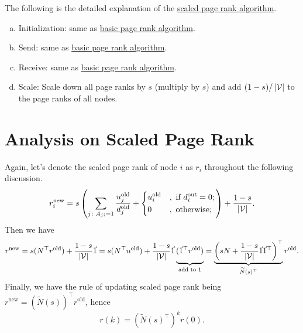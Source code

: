 \begin{remark}
	The following is the detailed explanation of the \hyperref[algo:scaled-page-rank-algorithm]{scaled page rank algorithm}.
	\begin{enumerate}[(a)]
		\item \label{algo:scaled-page-rank-algorithm:initialize} Initialization: same as \hyperref[algo:basic-page-rank-algorithm]{basic page rank algorithm}.
		\item \label{algo:scaled-page-rank-algorithm:send} Send: same as \hyperref[algo:basic-page-rank-algorithm]{basic page rank algorithm}.
		\item \label{algo:scaled-page-rank-algorithm:receive} Receive: same as \hyperref[algo:basic-page-rank-algorithm]{basic page rank algorithm}.
		\item \label{algo:scaled-page-rank-algorithm:scale} Scale: Scale down all page ranks by \(s\) (multiply by \(s\)) and
		      add \((1-s) / \left\vert \mathcal{\MakeUppercase{v}} \right\vert \) to the page ranks of all nodes.
	\end{enumerate}
\end{remark}

\section{Analysis on Scaled Page Rank}
Again, let's denote the scaled page rank of node \(i\) as \(r_i\) throughout the following discussion.
\[
	r_{i}^{\text{new}} = s\left(\sum\limits_{j\colon A_{ji} = 1} \frac{u_{j}^{\text{old}}}{d_{j}^{\text{old}}}+\begin{dcases}
		u_{i}^{\text{old}} & , \text{ if }d_{i}^{\text{out}} = 0; \\
		0                  & , \text{ otherwise};
	\end{dcases}\right)+\frac{1-s}{\vert \mathcal{V}\vert}.
\]
Then we have
\[
	\begin{split}
		r^{\text{new}} = s(N^{\top}r^{\text{old}})+\frac{1-s}{\vert \mathcal{V}\vert}\vec{1}
		= s(N^{\top}u^{\text{old}}) + \frac{1-s}{\vert \mathcal{V}\vert}\vec{1} \underbrace{\vphantom{\left(sN + \frac{1-s}{\vert \mathcal{V}\vert}\vec{1}\vec{1}^{\top}\right)^{\top}}(\vec{1}^{\top}r^{\text{old}})}_{\text{add to }1}
		= \underbrace{\left(sN + \frac{1-s}{\vert \mathcal{V}\vert}\vec{1}\vec{1}^{\top}\right)^{\top}}_{\widetilde{N}(s)^{\top}} r^{\text{old}}.
	\end{split}
\]
Finally, we have the rule of updating scaled page rank being \(r^{\text{new}} = (\widetilde{N}(s))^{\top}r^{\text{old}}\), hence
\[
	r(k) = \left(\widetilde{N}(s)^{\top}\right)^k r(0).
\]

